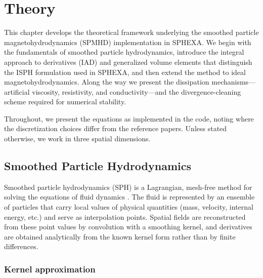 
\section{Theory}
\label{sec:theory}

This chapter develops the theoretical framework underlying the smoothed particle magnetohydrodynamics (SPMHD) implementation in SPHEXA. We begin with the fundamentals of smoothed particle hydrodynamics, introduce the integral approach to derivatives (IAD) and generalized volume elements that distinguish the ISPH formulation used in SPHEXA, and then extend the method to ideal magnetohydrodynamics. Along the way we present the dissipation mechanisms---artificial viscosity, resistivity, and conductivity---and the divergence-cleaning scheme required for numerical stability.

Throughout, we present the equations as implemented in the code, noting where the discretization choices differ from the reference papers. Unless stated otherwise, we work in three spatial dimensions.


\subsection{Smoothed Particle Hydrodynamics}
\label{sec:sph}

Smoothed particle hydrodynamics (SPH) is a Lagrangian, mesh-free method for solving the equations of fluid dynamics \cite{Rosswog2009}. The fluid is represented by an ensemble of particles that carry local values of physical quantities (mass, velocity, internal energy, etc.) and serve as interpolation points. Spatial fields are reconstructed from these point values by convolution with a smoothing kernel, and derivatives are obtained analytically from the known kernel form rather than by finite differences.


\subsubsection*{Kernel approximation}

